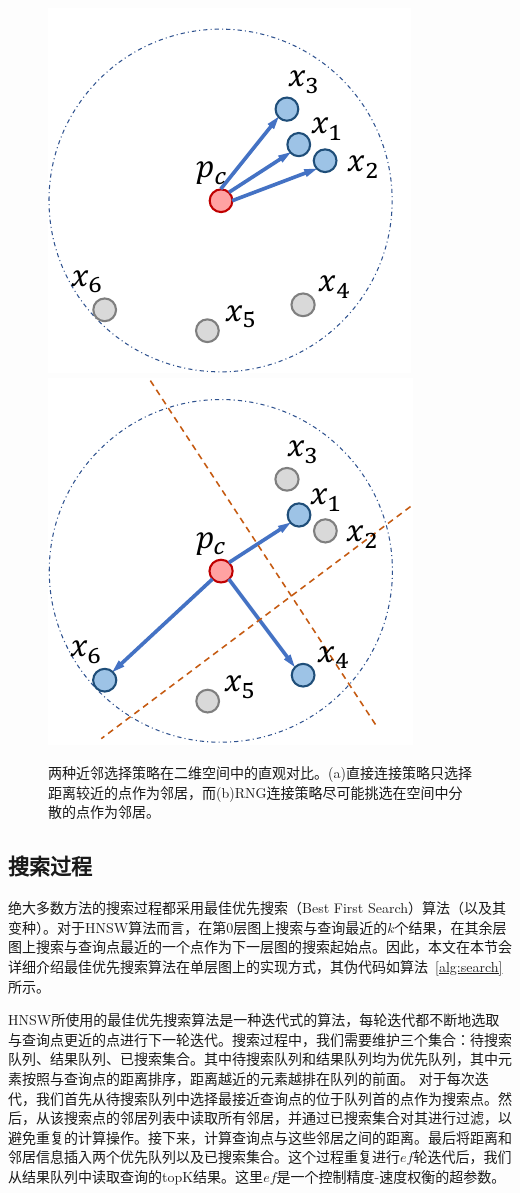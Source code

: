 \begin{figure}
  \centering
    {\includegraphics[width=0.35\linewidth]{figures/Background/select-naive.pdf}}
    {\includegraphics[width=0.35\linewidth]{figures/Background/select-rng.pdf}}
  \caption{两种近邻选择策略在二维空间中的直观对比。(a)直接连接策略只选择距离较近的点作为邻居，而(b)RNG连接策略尽可能挑选在空间中分散的点作为邻居。}
  \label{fig:nbor-select}
\end{figure}



\subsection{搜索过程}

绝大多数\ganns 方法的搜索过程都采用最佳优先搜索\cite{nsg-2019, ganns-survey-2021}（Best First Search）算法（以及其变种）。对于HNSW算法而言，在第0层图上搜索与查询最近的$k$个结果，在其余层图上搜索与查询点最近的一个点作为下一层图的搜索起始点。因此，本文在本节会详细介绍最佳优先搜索算法在单层图上的实现方式，其伪代码如算法~\ref{alg:search}所示。

HNSW所使用的最佳优先搜索算法是一种迭代式的算法，每轮迭代都不断地选取与查询点更近的点进行下一轮迭代。搜索过程中，我们需要维护三个集合：待搜索队列、结果队列、已搜索集合。其中待搜索队列和结果队列均为优先队列，其中元素按照与查询点的距离排序，距离越近的元素越排在队列的前面。
对于每次迭代，我们首先从待搜索队列中选择最接近查询点的位于队列首的点作为搜索点。然后，从该搜索点的邻居列表中读取所有邻居，并通过已搜索集合对其进行过滤，以避免重复的计算操作。接下来，计算查询点与这些邻居之间的距离。最后将距离和邻居信息插入两个优先队列以及已搜索集合。这个过程重复进行$ef$轮迭代后，我们从结果队列中读取查询的topK结果。这里$ef$是一个控制精度-速度权衡的超参数。


